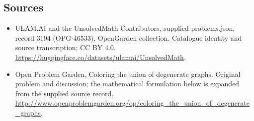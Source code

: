 \documentclass[11pt,a4paper]{article}
\begin{document}
\subsection{Sources}
\begin{itemize}
\item[S1] ULAM.AI and the UnsolvedMath Contributors, supplied problems.json, record 3194 (OPG-46533), OpenGarden collection. Catalogue identity and source transcription; CC BY 4.0.
\url{https://huggingface.co/datasets/ulamai/UnsolvedMath}.
\item[S2] Open Problem Garden, Coloring the union of degenerate graphs. Original problem and discussion; the mathematical formulation below is expanded from the supplied source record.
\url{http://www.openproblemgarden.org/op/coloring_the_union_of_degenerate_graphs}.

\end{itemize}
\end{document}
